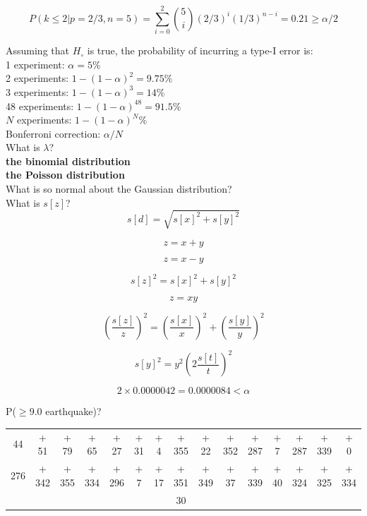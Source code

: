 \documentclass{article}
\begin{document}
\[
P({k}\leq{2}|p=2/3,n=5) =
\sum\limits_{i=0}^{2}\binom{5}{i}(2/3)^i(1/3)^{n-i} = 0.21 \geq \alpha/2
\]

Assuming that $H_\circ$ is true, the probability of incurring a type-I
error is:\\

1 experiment: $\alpha = 5\%$\\

2 experiments: $1-(1-\alpha)^2=9.75\%$\\

3 experiments: $1-(1-\alpha)^3=14\%$\\

48 experiments:   $1-(1-\alpha)^{48}=91.5\%$\\

$N$ experiments:   $1-(1-\alpha)^{N}\%$\\

Bonferroni correction: $\alpha/N$\\

What is $\lambda$?\\

\textbf{the binomial distribution}\\

\textbf{the Poisson distribution}\\

What is so normal about the Gaussian distribution?\\

What is $s[z]$?\\

\[
s[d] = \sqrt{s[x]^2 + s[y]^2}
\]

\[
z = x + y
\]

\[
z = x - y
\]

\[
s[z]^2 = s[x]^2 + s[y]^2
\]

\[
z = xy
\]

\[
\left(\frac{s[z]}{z}\right)^2 =
\left(\frac{s[x]}{x}\right)^2 + \left(\frac{s[y]}{y}\right)^2
\]

\[
s[y]^2 = y^2\left(2\frac{s[t]}{t}\right)^2
\]

\[
2 \times 0.0000042 = 0.0000084 < \alpha
\]

P($\geq{9.0}$ earthquake)?

\begin{center}
\begin{tabular}{c@{~}c@{~}c@{~}c@{~}c@{~}c@{~}c@{~}c@{~}c@{~}c@{~}c@{~}c@{~}c@{~}c@{~}c}
  44 & + 51 & + 79 & + 65 & + 27 & + 31 & + 4 & + 355 & +
  22 & + 352 & + 287 & + 7 & + 287 & + 339 & + 0 \\
  276 & + 342 & + 355 & + 334 & + 296 & + 7 & + 17 & +
  351 & + 349 & + 37 & + 339 & + 40 & + 324 & + 325 & + 334\\ \hline
  & & & & & & & 30 & & & & & & & 
\end{tabular}
\end{center}
\end{document}
